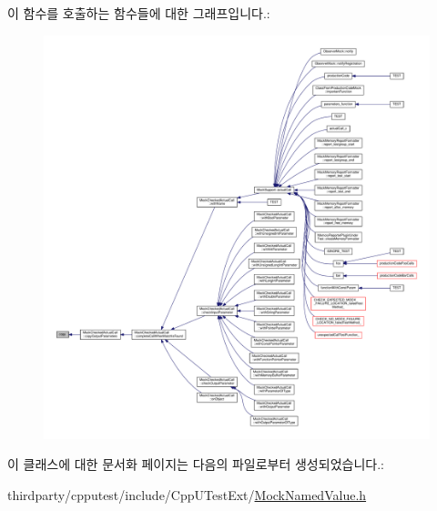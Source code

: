 이 함수를 호출하는 함수들에 대한 그래프입니다.\+:
\nopagebreak
\begin{figure}[H]
\begin{center}
\leavevmode
\includegraphics[width=350pt]{class_mock_named_value_copier_aa02ce3bdc5575d21faa2c0ea37e1b160_icgraph}
\end{center}
\end{figure}




이 클래스에 대한 문서화 페이지는 다음의 파일로부터 생성되었습니다.\+:\begin{DoxyCompactItemize}
\item 
thirdparty/cpputest/include/\+Cpp\+U\+Test\+Ext/\hyperlink{_mock_named_value_8h}{Mock\+Named\+Value.\+h}\end{DoxyCompactItemize}
